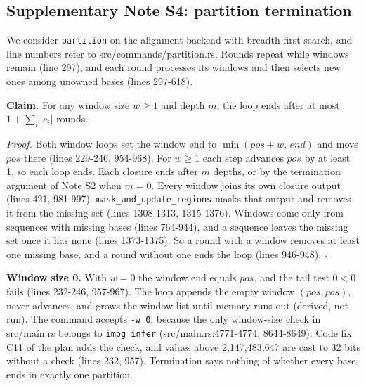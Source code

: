 \subsection*{Supplementary Note S4: partition termination}

We consider \texttt{partition} on the alignment backend with breadth-first search, and line numbers refer to src/commands/partition.rs.
Rounds repeat while windows remain (line 297), and each round processes its windows and then selects new ones among unowned bases (lines 297-618).

\textbf{Claim.}
For any window size $w\ge 1$ and depth $m$, the loop ends after at most $1+\sum_i|s_i|$ rounds.

\emph{Proof.}
Both window loops set the window end to $\min(pos+w,\,end)$ and move $pos$ there (lines 229-246, 954-968).
For $w\ge 1$ each step advances $pos$ by at least 1, so each loop ends.
Each closure ends after $m$ depths, or by the termination argument of Note S2 when $m=0$.
Every window joins its own closure output (lines 421, 981-997).
\texttt{mask\_and\_update\_regions} masks that output and removes it from the missing set (lines 1308-1313, 1315-1376).
Windows come only from sequences with missing bases (lines 764-944), and a sequence leaves the missing set once it has none (lines 1373-1375).
So a round with a window removes at least one missing base, and a round without one ends the loop (lines 946-948).
$\square$

\textbf{Window size 0.}
With $w=0$ the window end equals $pos$, and the tail test $0<0$ fails (lines 232-246, 957-967).
The loop appends the empty window $(pos,pos)$, never advances, and grows the window list until memory runs out (derived, not run).
The command accepts \texttt{-w 0}, because the only window-size check in src/main.rs belongs to \texttt{impg infer} (src/main.rs:4771-4774, 8644-8649).
Code fix C11 of the plan adds the check, and values above 2,147,483,647 are cast to 32 bits without a check (lines 232, 957).
Termination says nothing of whether every base ends in exactly one partition.
